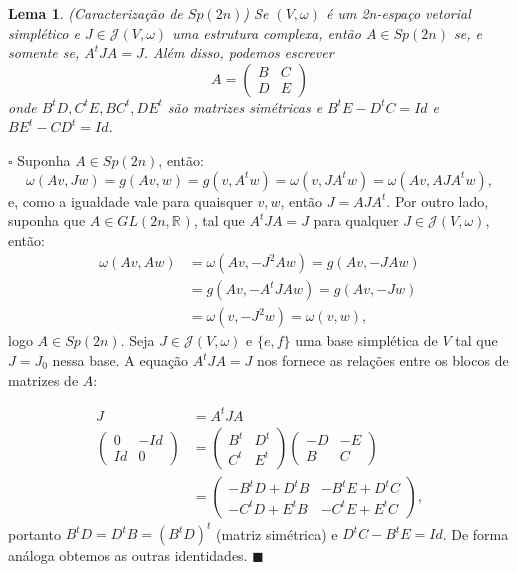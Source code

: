 \documentclass[12pt]{book}
\newtheorem{lema}[teorema]{Lema}
\newenvironment{prova}[1]{$\square$ #1}{\hfill$\blacksquare$}
\newcommand{\estruturacomplexa}{J_{0}}
\newcommand{\estruturascomplexaspadrao}{\mathcal{J}(V, \omega)}
\newcommand{\generalgroup}[2]{GL(#1, #2)}
\newcommand{\generalgroupreal}[1]{\generalgroup{#1}{\real{}}}
\newcommand{\gruposimpletico}[1]{Sp(#1)}
\newcommand{\real}[1]{\mathbb{R}^{#1}}
\begin{document}
	\begin{lema}\label{lema_caracterizacao_Sp2n}
		(Caracterização de $Sp(2n)$) Se $(V, \omega)$ é um 2n-espaço vetorial simplético e $J \in \estruturascomplexaspadrao$ uma estrutura complexa, então $A\in Sp(2n)$ se, e somente se, $A^{t}JA = J$. Além disso, podemos escrever 
		$$
		A=
		\left(
		\begin{array}{cc}
		B & C
		\\
		D & E
		\end{array}
		\right)
		$$
		onde $B^{t}D, C^{t}E, BC^{t}, DE^{t} $ são matrizes simétricas e $B^{t}E - D^{t}C = Id$ e $BE^{t} - CD^{t} = Id$.
	\end{lema}
	\begin{prova}
		Suponha $A \in Sp(2n)$, então:
		$$
		\omega(Av, Jw)= g(Av,w) = g(v,A^{t}w) = \omega(v, JA^{t}w) = \omega(Av, AJA^{t}w),
		$$
		e, como a igualdade vale para quaisquer $v,w$, então $J = AJA^{t}$. Por outro lado, suponha que $A \in \generalgroupreal{2n}$, tal que $A^{t}JA=J$ para qualquer $J \in \estruturascomplexaspadrao$, então:
		$$
		\begin{aligned}
		\omega(Av, Aw) &= \omega(Av, -J^{2}Aw)=g(Av, -JAw) \\
		&= g(Av, -A^{t}JAw) = g(Av, -Jw) 
		\\
		&= \omega(v, -J^{2}w) = \omega(v, w), 
		\end{aligned}
		$$
		logo $A \in \gruposimpletico{2n}$. Seja $J \in \estruturascomplexaspadrao$ e $\{e, f\}$ uma base simplética de $V$ tal que $J = \estruturacomplexa$ nessa base. A equação $A^{t}JA=J$ nos fornece as relações entre os blocos de matrizes de $A$:
		
		$$
		\begin{aligned}
			J &= A^{t}JA
			\\
			\left(
				\begin{array}{cc}
				0 & -Id
				\\
				Id & 0
				\end{array}
			\right)
			&=
			\left(
				\begin{array}{cc}
				B^{t} & D^{t}
				\\
				C^{t} & E^{t}
				\end{array}
			\right)
			\left(
				\begin{array}{cc}
				-D & -E
				\\
				B & C
				\end{array}
			\right)
			\\
			&=
			\left(
				\begin{array}{cc}
				-B^{t}D +D^{t}B & -B^{t}E+D^{t}C
				\\
				-C^{t}D+E^{t}B & -C^{t}E+E^{t}C
				\end{array}
			\right),
		\end{aligned}
		$$
		portanto $B^{t}D = D^{t}B = (B^{t}D)^{t}$ (matriz simétrica) e $D^{t}C-B^{t}E = Id$. De forma análoga obtemos as outras identidades.
	\end{prova}
	
\end{document}
